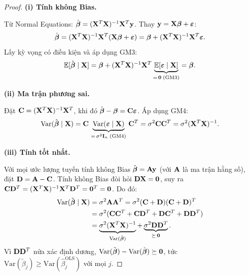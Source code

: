 \begin{proof}
\textbf{(i) Tính không Bias.}

Từ Normal Equations: $\hat{\boldsymbol{\beta}} = (\mathbf{X}^T\mathbf{X})^{-1}\mathbf{X}^T\mathbf{y}$.
Thay $\mathbf{y} = \mathbf{X}\boldsymbol{\beta} + \boldsymbol{\varepsilon}$:
\[
    \hat{\boldsymbol{\beta}}
    = (\mathbf{X}^T\mathbf{X})^{-1}\mathbf{X}^T(\mathbf{X}\boldsymbol{\beta} + \boldsymbol{\varepsilon})
    = \boldsymbol{\beta} + (\mathbf{X}^T\mathbf{X})^{-1}\mathbf{X}^T\boldsymbol{\varepsilon}.
\]
Lấy kỳ vọng có điều kiện và áp dụng GM3:
\[
    \mathbb{E}[\hat{\boldsymbol{\beta}} \mid \mathbf{X}]
    = \boldsymbol{\beta}
      + (\mathbf{X}^T\mathbf{X})^{-1}\mathbf{X}^T
        \underbrace{\mathbb{E}[\boldsymbol{\varepsilon} \mid \mathbf{X}]}_{=\,\mathbf{0}\;\text{(GM3)}}
    = \boldsymbol{\beta}.
\]

\medskip
\noindent\textbf{(ii) Ma trận phương sai.}

Đặt $\mathbf{C} = (\mathbf{X}^T\mathbf{X})^{-1}\mathbf{X}^T$, khi đó
$\hat{\boldsymbol{\beta}} - \boldsymbol{\beta} = \mathbf{C}\boldsymbol{\varepsilon}$.
Áp dụng GM4:
\[
    \mathrm{Var}(\hat{\boldsymbol{\beta}} \mid \mathbf{X})
    = \mathbf{C}\,\underbrace{\mathrm{Var}(\boldsymbol{\varepsilon} \mid \mathbf{X})}_{=\,\sigma^2\mathbf{I}_n\;\text{(GM4)}}\,\mathbf{C}^T
    = \sigma^2\mathbf{C}\mathbf{C}^T
    = \sigma^2(\mathbf{X}^T\mathbf{X})^{-1}.
\]

\medskip
\noindent\textbf{(iii) Tính tốt nhất.}

Với mọi ước lượng tuyến tính không Bias $\tilde{\boldsymbol{\beta}} = \mathbf{A}\mathbf{y}$
(với $\mathbf{A}$ là ma trận hằng số), đặt $\mathbf{D} = \mathbf{A} - \mathbf{C}$.
Tính không Bias đòi hỏi $\mathbf{D}\mathbf{X} = \mathbf{0}$, suy ra
$\mathbf{C}\mathbf{D}^T = (\mathbf{X}^T\mathbf{X})^{-1}\mathbf{X}^T\mathbf{D}^T = \mathbf{0}^T = \mathbf{0}$. Do đó:
\begin{align*}
    \mathrm{Var}(\tilde{\boldsymbol{\beta}} \mid \mathbf{X})
    &= \sigma^2\mathbf{A}\mathbf{A}^T
     = \sigma^2(\mathbf{C} + \mathbf{D})(\mathbf{C} + \mathbf{D})^T \\
    &= \sigma^2(\mathbf{C}\mathbf{C}^T + \mathbf{C}\mathbf{D}^T + \mathbf{D}\mathbf{C}^T + \mathbf{D}\mathbf{D}^T) \\
    &= \underbrace{\sigma^2(\mathbf{X}^T\mathbf{X})^{-1}}_{\mathrm{Var}(\hat{\boldsymbol{\beta}})}
       + \underbrace{\sigma^2\mathbf{D}\mathbf{D}^T}_{\succeq\,\mathbf{0}}.
\end{align*}
Vì $\mathbf{D}\mathbf{D}^T$ nửa xác định dương,
$\mathrm{Var}(\tilde{\boldsymbol{\beta}}) - \mathrm{Var}(\hat{\boldsymbol{\beta}}) \succeq \mathbf{0}$,
tức $\mathrm{Var}(\tilde{\beta}_j) \geq \mathrm{Var}(\hat{\beta}_j^{\mathrm{OLS}})$ với mọi $j$.
\end{proof}

